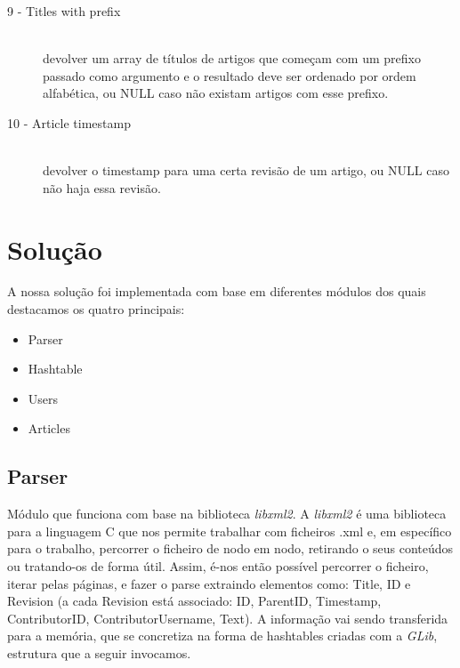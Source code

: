 \documentclass[a4paper]{article}
\begin{document}
\begin{description}
\item[9 - Titles with prefix]\hfill \\
devolver um array de títulos de artigos que começam com um prefixo passado como argumento e o resultado deve ser ordenado por ordem alfabética, ou NULL caso não existam artigos com esse prefixo.
\item[10 - Article timestamp]\hfill \\
devolver o timestamp para uma certa revisão de um artigo, ou NULL caso não haja essa revisão.
\end{description}

\section{Solução}
A nossa solução foi implementada com base em diferentes módulos dos quais destacamos os quatro principais:

\begin{itemize}
    \item Parser
    \item Hashtable
    \item Users
    \item Articles
\end{itemize}
\label{sec:solucao}

\subsection{Parser}
Módulo que funciona com base na biblioteca \textit{libxml2}. A \textit{libxml2} é uma biblioteca para a linguagem C que nos permite trabalhar com ficheiros .xml e, em específico para o trabalho, percorrer o ficheiro de nodo em nodo, retirando o seus conteúdos ou tratando-os de forma útil.
Assim, é-nos então possível percorrer o ficheiro, iterar pelas páginas, e fazer o parse extraindo elementos como: Title, ID e Revision (a cada Revision está associado: ID, ParentID, Timestamp, ContributorID, ContributorUsername, Text).
A informação vai sendo transferida para a memória, que se concretiza na forma de hashtables criadas com a \textit{GLib}, estrutura que a seguir invocamos.
\end{document}
